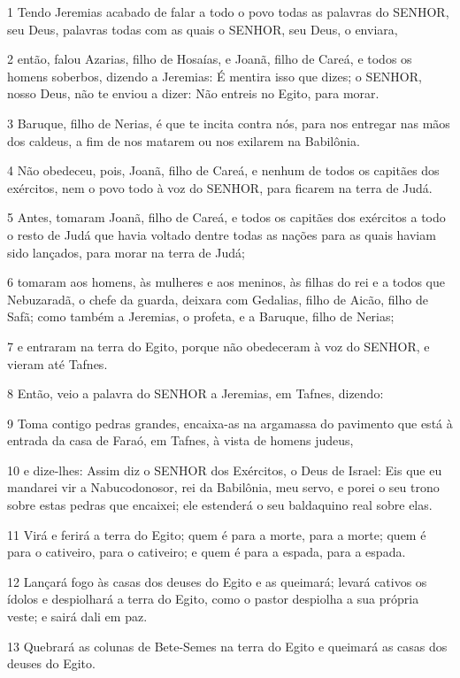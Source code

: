 \par 1 Tendo Jeremias acabado de falar a todo o povo todas as palavras do SENHOR, seu Deus, palavras todas com as quais o SENHOR, seu Deus, o enviara,
\par 2 então, falou Azarias, filho de Hosaías, e Joanã, filho de Careá, e todos os homens soberbos, dizendo a Jeremias: É mentira isso que dizes; o SENHOR, nosso Deus, não te enviou a dizer: Não entreis no Egito, para morar.
\par 3 Baruque, filho de Nerias, é que te incita contra nós, para nos entregar nas mãos dos caldeus, a fim de nos matarem ou nos exilarem na Babilônia.
\par 4 Não obedeceu, pois, Joanã, filho de Careá, e nenhum de todos os capitães dos exércitos, nem o povo todo à voz do SENHOR, para ficarem na terra de Judá.
\par 5 Antes, tomaram Joanã, filho de Careá, e todos os capitães dos exércitos a todo o resto de Judá que havia voltado dentre todas as nações para as quais haviam sido lançados, para morar na terra de Judá;
\par 6 tomaram aos homens, às mulheres e aos meninos, às filhas do rei e a todos que Nebuzaradã, o chefe da guarda, deixara com Gedalias, filho de Aicão, filho de Safã; como também a Jeremias, o profeta, e a Baruque, filho de Nerias;
\par 7 e entraram na terra do Egito, porque não obedeceram à voz do SENHOR, e vieram até Tafnes.
\par 8 Então, veio a palavra do SENHOR a Jeremias, em Tafnes, dizendo:
\par 9 Toma contigo pedras grandes, encaixa-as na argamassa do pavimento que está à entrada da casa de Faraó, em Tafnes, à vista de homens judeus,
\par 10 e dize-lhes: Assim diz o SENHOR dos Exércitos, o Deus de Israel: Eis que eu mandarei vir a Nabucodonosor, rei da Babilônia, meu servo, e porei o seu trono sobre estas pedras que encaixei; ele estenderá o seu baldaquino real sobre elas.
\par 11 Virá e ferirá a terra do Egito; quem é para a morte, para a morte; quem é para o cativeiro, para o cativeiro; e quem é para a espada, para a espada.
\par 12 Lançará fogo às casas dos deuses do Egito e as queimará; levará cativos os ídolos e despiolhará a terra do Egito, como o pastor despiolha a sua própria veste; e sairá dali em paz.
\par 13 Quebrará as colunas de Bete-Semes na terra do Egito e queimará as casas dos deuses do Egito.


